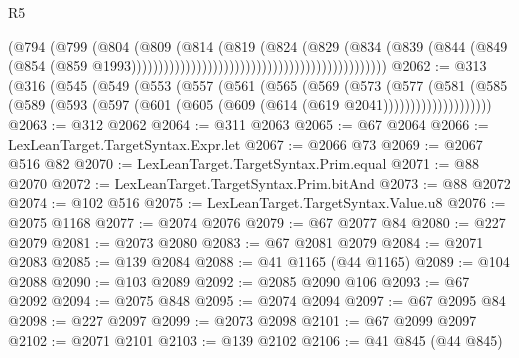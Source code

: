 \begin{lexlean}{R5}
\begin{coremodule}
                                                                      (@794
                                                                        (@799
                                                                          (@804
                                                                            (@809
                                                                              (@814
                                                                                (@819
                                                                                  (@824
                                                                                    (@829
                                                                                      (@834
                                                                                        (@839
                                                                                          (@844
                                                                                            (@849
                                                                                              (@854
                                                                                                (@859
                                                                                                  @1993)))))))))))))))))))))))))))))))))))))))))))))))
@2062 := @313
    (@316
      (@545
        (@549
          (@553
            (@557
              (@561
                (@565
                  (@569
                    (@573
                      (@577
                        (@581
                          (@585
                            (@589
                              (@593 (@597 (@601 (@605 (@609 (@614 (@619 @2041))))))))))))))))))))
@2063 := @312 @2062
@2064 := @311 @2063
@2065 := @67 @2064
@2066 := LexLeanTarget.TargetSyntax.Expr.let
@2067 := @2066 @73
@2069 := @2067 @516 @82
@2070 := LexLeanTarget.TargetSyntax.Prim.equal
@2071 := @88 @2070
@2072 := LexLeanTarget.TargetSyntax.Prim.bitAnd
@2073 := @88 @2072
@2074 := @102 @516
@2075 := LexLeanTarget.TargetSyntax.Value.u8
@2076 := @2075 @1168
@2077 := @2074 @2076
@2079 := @67 @2077 @84
@2080 := @227 @2079
@2081 := @2073 @2080
@2083 := @67 @2081 @2079
@2084 := @2071 @2083
@2085 := @139 @2084
@2088 := @41 @1165 (@44 @1165)
@2089 := @104 @2088
@2090 := @103 @2089
@2092 := @2085 @2090 @106
@2093 := @67 @2092
@2094 := @2075 @848
@2095 := @2074 @2094
@2097 := @67 @2095 @84
@2098 := @227 @2097
@2099 := @2073 @2098
@2101 := @67 @2099 @2097
@2102 := @2071 @2101
@2103 := @139 @2102
@2106 := @41 @845 (@44 @845)

\end{coremodule}
\end{lexlean}
